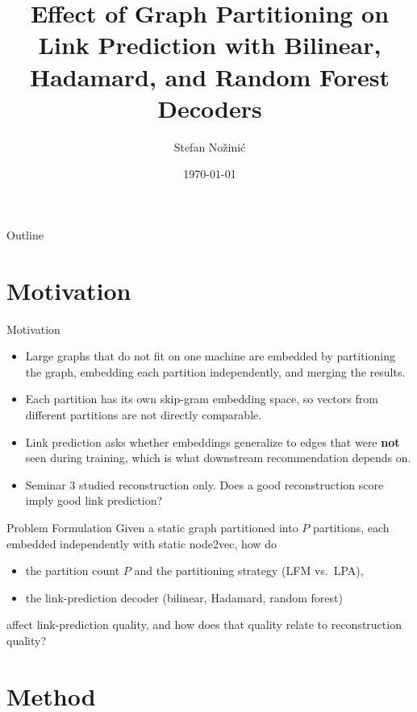 \documentclass[aspectratio=169]{beamer}
\title[Partitioning and Link Prediction]{Effect of Graph Partitioning on Link Prediction with Bilinear, Hadamard, and Random Forest Decoders}
\author{Stefan Nožinić}
\institute{Seminar 4}
\date{\today}
\begin{document}
\begin{frame}
  \titlepage
\end{frame}

\begin{frame}{Outline}
  \tableofcontents
\end{frame}

\section{Motivation}

\begin{frame}{Motivation}
  \begin{itemize}
    \item Large graphs that do not fit on one machine are embedded by partitioning the graph, embedding each partition independently, and merging the results.
    \item Each partition has its own skip-gram embedding space, so vectors from different partitions are not directly comparable.
    \item Link prediction asks whether embeddings generalize to edges that were \textbf{not} seen during training, which is what downstream recommendation depends on.
    \item Seminar 3 studied reconstruction only. Does a good reconstruction score imply good link prediction?
  \end{itemize}
\end{frame}

\begin{frame}{Problem Formulation}
  Given a static graph partitioned into $P$ partitions, each embedded independently with static node2vec, how do
  \begin{itemize}
    \item the partition count $P$ and the partitioning strategy (LFM vs.\ LPA),
    \item the link-prediction decoder (bilinear, Hadamard, random forest)
  \end{itemize}
  affect link-prediction quality, and how does that quality relate to reconstruction quality?
\end{frame}

\section{Method}
\end{document}
